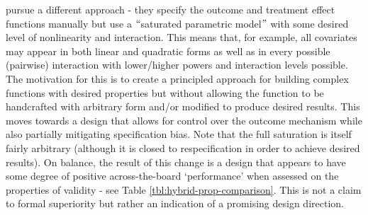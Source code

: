 \documentclass[../main.tex]{subfiles}
\begin{document}
\vspace{\baselineskip}
\textcite{Kern2016AssessingPopulations} pursue a different approach - they specify the outcome and treatment effect functions manually but use a $``$saturated parametric model$"$  with some desired level of nonlinearity and interaction. This means that, for example, all covariates may appear in both linear and quadratic forms as well as in every possible (pairwise) interaction with lower/higher powers and interaction levels possible. The motivation for this is to create a principled approach for building complex functions with desired properties but without allowing the function to be handcrafted with arbitrary form and/or modified to produce desired results. This moves towards a design that allows for control over the outcome mechanism while also partially mitigating specification bias. Note that the full saturation is itself fairly arbitrary (although it is closed to respecification in order to achieve desired results). On balance, the result of this change is a design that appears to have some degree of positive across-the-board ‘performance’ when assessed on the properties of validity - see Table \ref{tbl:hybrid-prop-comparison}. This is not a claim to formal superiority but rather an indication of a promising design direction.\par


\vspace{\baselineskip}


\end{document}
